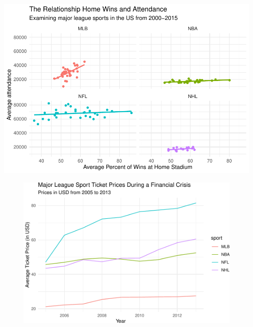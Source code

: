 \documentclass[man, fleqn, noextraspace,floatsintext]{apa6}
\begin{document}
\includegraphics{Final_Project_files/figure-latex/plots-4.pdf}

\begin{figure}
\centering
\includegraphics{Final_Project_files/figure-latex/sports_crisis-1.pdf}
\caption{}
\end{figure}
\end{document}
